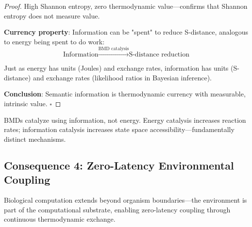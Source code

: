 \begin{proof}
High Shannon entropy, zero thermodynamic value—confirms that Shannon entropy does not measure value.

\textbf{Currency property}: Information can be "spent" to reduce S-distance, analogous to energy being spent to do work:
\begin{equation}
\text{Information} \xrightarrow{\text{BMD catalysis}} \text{S-distance reduction}
\end{equation}

Just as energy has units (Joules) and exchange rates, information has units (S-distance) and exchange rates (likelihood ratios in Bayesian inference).

\textbf{Conclusion}: Semantic information is thermodynamic currency with measurable, intrinsic value. $\square$
\end{proof}

\begin{corollary}
BMDs catalyze using information, not energy. Energy catalysis increases reaction rates; information catalysis increases state space accessibility—fundamentally distinct mechanisms.
\end{corollary}

\subsection{Consequence 4: Zero-Latency Environmental Coupling}

\begin{theorem}
\label{thm:extended_boundary}
Biological computation extends beyond organism boundaries—the environment is part of the computational substrate, enabling zero-latency coupling through continuous thermodynamic exchange.
\end{theorem}

